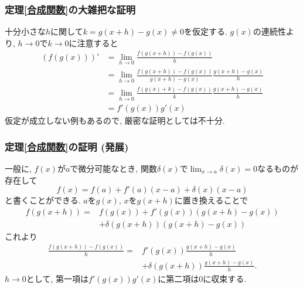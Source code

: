 \documentclass[dvipdfmx,cjk,10.2pt]{beamer}
\theoremstyle{definition}
\begin{document}


\begin{frame}
\frametitle{定理\ref{合成関数}の大雑把な証明}


十分小さな$h$に関して$k=g(x+h)- g(x)\ne 0$を仮定する. 
$g(x)$の連続性より, $h \to 0$で$k\to 0$に注意すると
\begin{align*} 
(f(g(x)))' &= \lim_{h\to 0}\frac{f(g(x+h))-f(g(x))}{h} \\
& =  \lim_{h\to 0}\frac{f(g(x+h))-f(g(x))}{g(x+h)-g(x)} \frac{g(x+h)-g(x)}{h} \\
& =  \lim_{h\to 0}\frac{f(g(x)+k)-f(g(x))}{k} \frac{g(x+h)-g(x)}{h} \\
& =f'(g(x))g'(x)
\end{align*}
仮定が成立しない例もあるので, 厳密な証明としては不十分. 

\end{frame}




\begin{frame}
\frametitle{定理\ref{合成関数}の証明 (発展)}


一般に, $f(x)$が$a$で微分可能なとき, 関数$\delta(x)$で$\displaystyle \lim_{x\to a}\delta(x)=0$なるものが存在して
$$
f(x)=f(a)+f'(a)(x-a)+\delta(x)(x-a)
$$
と書くことができる. 
$a$を$g(x)$, $x$を$g(x+h)$に置き換えることで
\begin{align*} 
f(g(x+h))=& f(g(x))+f'(g(x))(g(x+h)-g(x)) \\
&+\delta(g(x+h))(g(x+h)-g(x)) 
\end{align*}
これより
\begin{align*} 
\frac{f(g(x+h))-f(g(x))}{h}= & f'(g(x))\frac{g(x+h)-g(x)}{h} \\
&+\delta(g(x+h))\frac{g(x+h)-g(x)}{h}. 
\end{align*}
$h\to 0$として, 第一項は$f'(g(x))g'(x)$に第二項は$0$に収束する. 
\end{frame}




\end{document}
